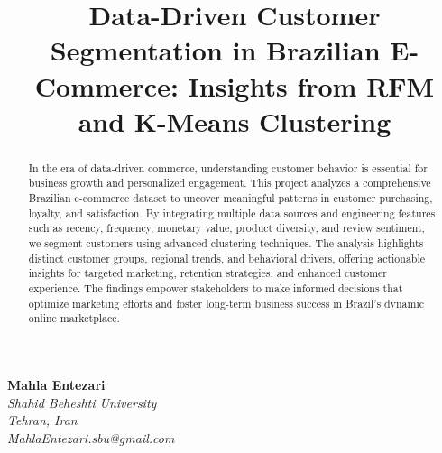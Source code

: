 \documentclass[a4paper]{article}
\title{
    \textbf{Data-Driven Customer Segmentation in Brazilian E-Commerce: Insights from RFM and K-Means Clustering} 
}
\date{} %
\begin{document}
\maketitle
\vspace{-1.5cm}

\begin{center}
    \textbf{Mahla Entezari}\\
    \textit{Shahid Beheshti University}\\
    \textit{Tehran, Iran}\\
    \textit{MahlaEntezari.sbu@gmail.com}
    \vfill
\end{center}


\begin{abstract}
In the era of data-driven commerce, understanding customer behavior is essential for business growth and personalized engagement. This project analyzes a comprehensive Brazilian e-commerce dataset to uncover meaningful patterns in customer purchasing, loyalty, and satisfaction. By integrating multiple data sources and engineering features such as recency, frequency, monetary value, product diversity, and review sentiment, we segment customers using advanced clustering techniques. The analysis highlights distinct customer groups, regional trends, and behavioral drivers, offering actionable insights for targeted marketing, retention strategies, and enhanced customer experience. The findings empower stakeholders to make informed decisions that optimize marketing efforts and foster long-term business success in Brazil’s dynamic online marketplace.
\end{abstract}


\singlespacing
\setlength{\parskip}{6pt}
\setlength{\parindent}{0.5cm}
\end{document}
